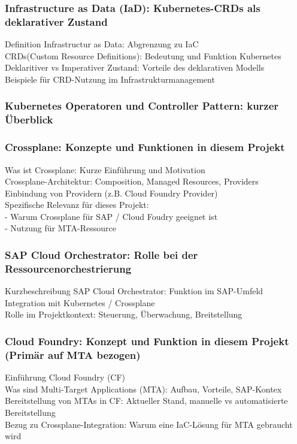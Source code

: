 \subsubsection{Infrastructure as Data (IaD): Kubernetes-CRDs als deklarativer Zustand}
Definition Infrastructur as Data: Abgrenzung zu IaC \\
CRDs(Custom Resource Definitions): Bedeutung und Funktion Kubernetes \\
Deklaritiver vs Imperativer Zustand: Vorteile des deklarativen Modells \\
Beispiele für CRD-Nutzung im Infrastrukturmanagement


\subsubsection{Kubernetes Operatoren und Controller Pattern: kurzer Überblick}

\subsubsection{Crossplane: Konzepte und Funktionen in diesem Projekt}
Was ist Crossplane: Kurze Einführung und Motivation \\
Crossplane-Architektur: Composition, Managed Resources, Providers \\
Einbindung von Providern (z.B. Cloud Foundry Provider) \\
Spezifische Relevanz für dieses Projekt: \\
    - Warum Crossplane für SAP / Cloud Foudry geeignet ist \\
    - Nutzung für MTA-Ressource

\subsubsection{SAP Cloud Orchestrator: Rolle bei der Ressourcenorchestrierung}
Kurzbeschreibung SAP Cloud Orchestrator: Funktion im SAP-Umfeld \\
Integration mit Kubernetes / Crossplane \\
Rolle im Projektkontext: Steuerung, Überwachung, Breitstellung

\subsubsection{Cloud Foundry: Konzept und Funktion in diesem Projekt (Primär auf MTA bezogen)}
Einführung Cloud Foundry (CF) \\
Was sind Multi-Target Applications (MTA): Aufbau, Vorteile, SAP-Kontex \\
Bereitstellung von MTAs in CF: Aktueller Stand, manuelle vs automatisierte Bereitstellung \\
Bezug zu Crossplane-Integration: Warum eine IaC-Lösung für MTA gebraucht wird

